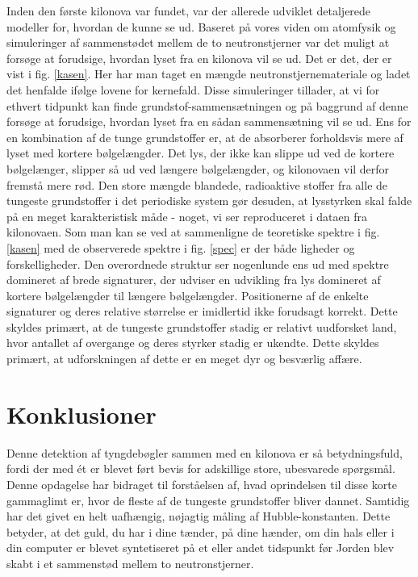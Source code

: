 \documentclass[twocolumn]{article}
\begin{document}
Inden den første kilonova var fundet, var der allerede udviklet detaljerede modeller for, hvordan de kunne se ud. Baseret på vores viden om atomfysik og  simuleringer af sammenstødet mellem de to neutronstjerner var det muligt at forsøge at forudsige, hvordan lyset fra en kilonova vil se ud. Det er det, der er vist i fig. \ref{kasen}. Her har man taget en mængde neutronstjernemateriale og ladet det henfalde ifølge lovene for kernefald. Disse simuleringer tillader, at vi for ethvert tidpunkt kan finde grundstof-sammensætningen og på baggrund af denne forsøge at forudsige, hvordan lyset fra en sådan sammensætning vil se ud. Ens for en kombination af de tunge grundstoffer er, at de absorberer forholdsvis mere af lyset med kortere bølgelængder. Det lys, der ikke kan slippe ud ved de kortere bølgelænger, slipper så ud ved længere bølgelængder, og kilonovaen vil derfor fremstå mere rød. Den store mængde blandede, radioaktive stoffer fra alle de tungeste grundstoffer i det periodiske system gør desuden, at lysstyrken skal falde på en meget karakteristisk måde - noget, vi ser reproduceret i dataen fra kilonovaen. Som man kan se ved at sammenligne de teoretiske spektre i fig. \ref{kasen} med de observerede spektre i fig. \ref{spec} er der både ligheder og forskelligheder. Den overordnede struktur ser nogenlunde ens ud med spektre domineret af brede signaturer, der udviser en udvikling fra lys domineret af kortere bølgelængder til længere bølgelængder. Positionerne af de enkelte signaturer og deres relative størrelse er imidlertid ikke forudsagt korrekt. Dette skyldes primært, at de tungeste grundstoffer stadig er relativt uudforsket land, hvor antallet af overgange og deres styrker stadig er ukendte. Dette skyldes primært, at udforskningen af dette er en meget dyr og besværlig affære.



\section{Konklusioner}
Denne detektion af tyngdebøgler sammen med en kilonova er så betydningsfuld, fordi der med ét er blevet ført bevis for adskillige store, ubesvarede spørgsmål. Denne opdagelse har bidraget til forståelsen af, hvad oprindelsen til disse korte gammaglimt er, hvor de fleste af de tungeste grundstoffer bliver dannet. Samtidig har det givet en helt uafhængig, nøjagtig måling af Hubble-konstanten. Dette betyder, at det guld, du har i dine tænder, på dine hænder, om din hals eller i din computer er blevet syntetiseret på et eller andet tidspunkt før Jorden blev skabt i et sammenstød mellem to neutronstjerner. 
\end{document}
